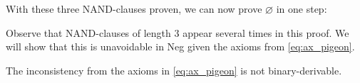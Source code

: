 \begin{figure}[!h]
  \centering
  \begin{prooftree*}[separation=0.8em, rule margin=1ex]
  \end{prooftree*}
  \caption{}
  \label{fig:proof_34}
\end{figure}
\FloatBarrier
With these three NAND-clauses proven, we can now prove $\varnothing$ in one step:\par
\begin{figure}[!h]
  \centering
  \begin{prooftree*}[rule margin=1ex]
  \end{prooftree*}
  \caption{}
  \label{fig:proof_empty}
\end{figure}
Observe that NAND-clauses of length 3 appear several times in this proof.
We will show that this is unavoidable in Neg given the axioms from \ref{eq:ax_pigeon}.
\begin{lemma}
  The inconsistency from the axioms in \ref{eq:ax_pigeon} is not binary-derivable.
\end{lemma}
